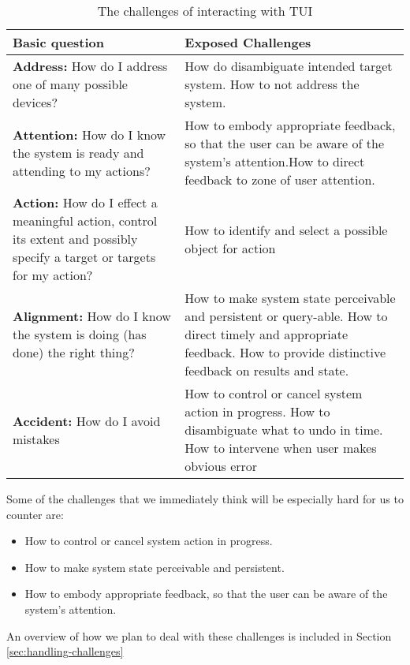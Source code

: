 \begin{table}[H]
	\begin{tabular}{| p{6.0cm} | p{7.0cm} |}
	\hline
	\textbf{Basic question} & \textbf{Exposed Challenges} \\
	\hline
	\textbf{Address:} How do I address one of many possible devices? & How do disambiguate intended target system. \newline How to not address the system. \\ 
	\hline
	\textbf{Attention:} How do I know the system is ready and attending to my actions? & How to embody appropriate feedback, so that the user can be aware of the system's attention.\newline How to direct feedback to zone of user attention. \\
	\hline
	\textbf{Action:} How do I effect a meaningful action, control its extent and possibly specify a target or targets for my action? & How to identify and select a possible object for action \\
	\hline
	\textbf{Alignment:} How do I know the system is doing (has done) the right thing? & How to make system state perceivable and persistent or query-able. \newline How to direct timely and appropriate feedback. \newline How to provide distinctive feedback on results and state. \\ 
	\hline 
	\textbf{Accident:} How do I avoid mistakes & How to control or cancel system action in progress. \newline How to disambiguate what to undo in time. \newline How to intervene when user makes obvious error \\
	\hline
	\end{tabular}
	\caption{The challenges of interacting with TUI\cite{bellotti2002making}}
	\label{tab:tuichallenges}
\end{table}

Some of the challenges that we immediately think will be especially hard for us to counter are:
\begin{itemize}
  \item How to control or cancel system action in progress.
  \item How to make system state perceivable and persistent. 
  \item How to embody appropriate feedback, so that the user can be aware of the system's attention. 
\end{itemize} 
An overview of how we plan to deal with these challenges is included in Section \ref{sec:handling-challenges}
 

